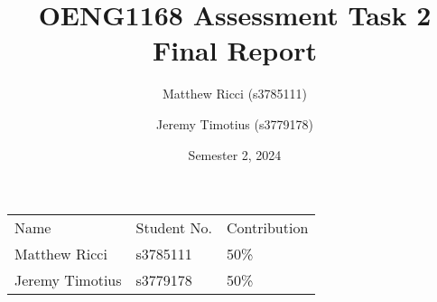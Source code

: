 \documentclass[a4paper, oneside]{memoir}
\begin{document}
\title{
    \textbf{\Huge OENG1168 Assessment Task 2} \\
    \vspace{0.5cm} 
    \textbf{\Huge Final Report} \\
}
\author{Matthew Ricci (s3785111) \and Jeremy Timotius (s3779178)}
\date{Semester 2, 2024}

\maketitle

\begin{tabular}{l l l}
Name & Student No. & Contribution \\
Matthew Ricci & s3785111 & 50\% \\
Jeremy Timotius & s3779178 & 50\%
\end{tabular}

\clearpage

\vspace{2.5em}
\tableofcontents*
\vfill

\thispagestyle{empty}
\clearpage




\end{document}
